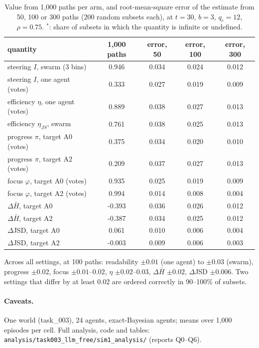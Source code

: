 \documentclass[10pt,a4paper]{article}
\begin{document}
\begin{table}[H]
\centering\small
\caption{Value from 1{,}000 paths per arm, and root-mean-square error of the estimate from 50, 100
or 300 paths (200 random subsets each), at $t = 30$, $b = 3$, $q_c = 12$, $\rho = 0.75$. $^\ast$: share of subsets in which
the quantity is infinite or undefined.}
\label{tab:effprec}
\begin{tabular}{lcccc}
\toprule
quantity & 1{,}000 paths & error, 50 & error, 100 & error, 300 \\
\midrule
steering $I$, swarm (3 bins) & 0.946 & 0.034 & 0.024 & 0.012 \\
steering $I$, one agent (votes) & 0.333 & 0.027 & 0.019 & 0.009 \\
efficiency $\eta$, one agent (votes) & 0.889 & 0.038 & 0.027 & 0.013 \\
efficiency $\eta_{JS}$, swarm & 0.761 & 0.038 & 0.025 & 0.013 \\
progress $\pi$, target A0 (votes) & 0.375 & 0.034 & 0.020 & 0.010 \\
progress $\pi$, target A2 (votes) & 0.209 & 0.037 & 0.027 & 0.013 \\
focus $\varphi$, target A0 (votes) & 0.935 & 0.025 & 0.019 & 0.009 \\
focus $\varphi$, target A2 (votes) & 0.994 & 0.014 & 0.008 & 0.004 \\
$\Delta\bar H$, target A0 & -0.393 & 0.036 & 0.026 & 0.012 \\
$\Delta\bar H$, target A2 & -0.387 & 0.034 & 0.025 & 0.012 \\
$\Delta$JSD, target A0 & 0.061 & 0.010 & 0.006 & 0.004 \\
$\Delta$JSD, target A2 & -0.003 & 0.009 & 0.006 & 0.003 \\
\bottomrule
\end{tabular}
\end{table}

\noindent Across all settings, at 100 paths: readability $\pm0.01$ (one agent) to $\pm0.03$ (swarm),
progress $\pm0.02$, focus $\pm0.01$--$0.02$, $\eta$ $\pm0.02$--$0.03$, $\Delta\bar H$ $\pm0.02$, $\Delta$JSD
$\pm0.006$. Two settings that differ by at least 0.02 are ordered correctly in 90--100\% of subsets.

\paragraph{Caveats.} One world (task\_003), 24 agents, exact-Bayesian agents; means over
1,000 episodes per cell. Full analysis, code and tables:
\texttt{analysis/task003\_llm\_free/sim1\_analysis/} (reports Q0--Q6).
\end{document}
